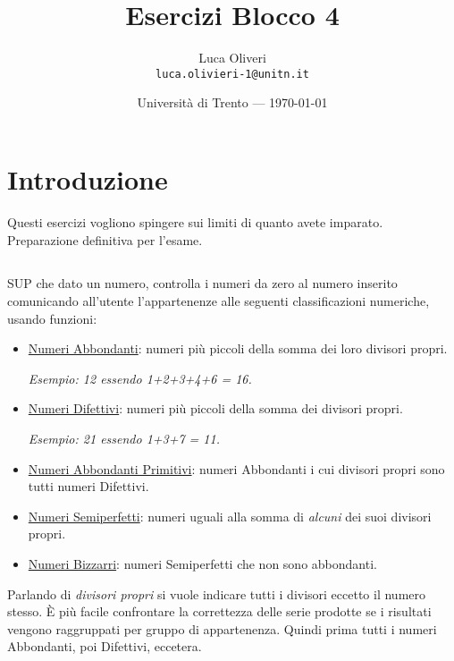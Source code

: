 \documentclass{article}
\title{Esercizi Blocco 4} %
\author{Luca Oliveri\\ \texttt{luca.olivieri-1@unitn.it}} %
\date{Università di Trento --- \today} %
\begin{document}
\maketitle %

\section*{Introduzione} %
Questi esercizi vogliono spingere sui limiti di quanto avete imparato. Preparazione definitiva per l'esame.

\setcounter{section}{4}

\subsection{}
SUP che dato un numero, controlla i numeri da zero al numero inserito comunicando all'utente l'appartenenze alle seguenti classificazioni numeriche, usando funzioni:
\begin{itemize}
	\item \href{https://en.wikipedia.org/wiki/Abundant_number}{Numeri Abbondanti}: numeri più piccoli della somma dei loro divisori propri. 
	
	\textit{Esempio: 12 essendo 1+2+3+4+6 = 16.}
	\item \href{https://en.wikipedia.org/wiki/Deficient_number}{Numeri Difettivi}: numeri più piccoli della somma dei divisori propri. 
	
	\textit{Esempio: 21 essendo 1+3+7 = 11. }
	\item \href{https://en.wikipedia.org/wiki/Primitive_abundant_number}{Numeri Abbondanti Primitivi}: numeri Abbondanti i cui divisori propri sono tutti numeri Difettivi.
	\item \href{https://en.wikipedia.org/wiki/Semiperfect_number}{Numeri Semiperfetti}: numeri uguali alla somma di \textit{alcuni} dei suoi divisori propri.
	\item \href{https://en.wikipedia.org/wiki/Weird_number}{Numeri Bizzarri}: numeri Semiperfetti che non sono abbondanti. 
\end{itemize}

\begin{info}
	Parlando di \textit{divisori propri} si vuole indicare tutti i divisori eccetto il numero stesso. È più facile confrontare la correttezza delle serie prodotte se i risultati vengono raggruppati per gruppo di appartenenza. Quindi prima tutti i numeri Abbondanti, poi Difettivi, eccetera.
\end{info}
\end{document}
